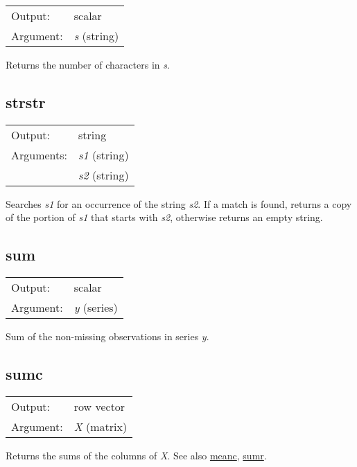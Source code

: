 \begin{tabular}{ll}
Output:     & scalar\\
Argument:   & \textsl{s} (string)\\
\end{tabular}

	  Returns the number of characters in \textsl{s}.

\subsection{strstr}
\hypertarget{func-strstr}{}

\begin{tabular}{ll}
Output:     & string\\
Arguments:  & \textsl{s1} (string)\\
           & \textsl{s2} (string)\\
\end{tabular}

	  Searches \textsl{s1} for an occurrence of the string
	  \textsl{s2}.  If a match is found, returns a copy of the
	  portion of \textsl{s1} that starts with
	  \textsl{s2}, otherwise returns an empty string.

\subsection{sum}
\hypertarget{func-sum}{}

\begin{tabular}{ll}
Output:     & scalar\\
Argument:   & \textsl{y} (series)\\
\end{tabular}

	  Sum of the non-missing observations in series
	  \textsl{y}.

\subsection{sumc}
\hypertarget{func-sumc}{}

\begin{tabular}{ll}
Output:     & row vector\\
Argument:   & \textsl{X} (matrix)\\
\end{tabular}

	  Returns the sums of the columns of \textsl{X}.
	  See also \hyperlink{func-meanc}{meanc}, \hyperlink{func-sumr}{sumr}.

